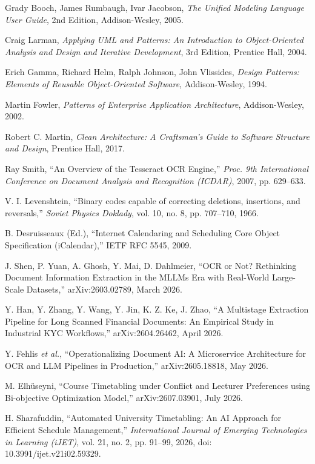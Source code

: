 
\begin{enumerate}[label={[\arabic*]}, leftmargin=*, itemsep=6pt]
  \item Grady Booch, James Rumbaugh, Ivar Jacobson, \textit{The Unified Modeling Language User Guide}, 2nd Edition, Addison-Wesley, 2005.
  \item Craig Larman, \textit{Applying UML and Patterns: An Introduction to Object-Oriented Analysis and Design and Iterative Development}, 3rd Edition, Prentice Hall, 2004.
  \item Erich Gamma, Richard Helm, Ralph Johnson, John Vlissides, \textit{Design Patterns: Elements of Reusable Object-Oriented Software}, Addison-Wesley, 1994.
  \item Martin Fowler, \textit{Patterns of Enterprise Application Architecture}, Addison-Wesley, 2002.
  \item Robert C. Martin, \textit{Clean Architecture: A Craftsman's Guide to Software Structure and Design}, Prentice Hall, 2017.
  \item Ray Smith, ``An Overview of the Tesseract OCR Engine,'' \textit{Proc. 9th International Conference on Document Analysis and Recognition (ICDAR)}, 2007, pp. 629--633.
  \item V. I. Levenshtein, ``Binary codes capable of correcting deletions, insertions, and reversals,'' \textit{Soviet Physics Doklady}, vol. 10, no. 8, pp. 707--710, 1966.
  \item B. Desruisseaux (Ed.), ``Internet Calendaring and Scheduling Core Object Specification (iCalendar),'' IETF RFC 5545, 2009.
  \item J. Shen, P. Yuan, A. Ghosh, Y. Mai, D. Dahlmeier, ``OCR or Not? Rethinking Document Information Extraction in the MLLMs Era with Real-World Large-Scale Datasets,'' arXiv:2603.02789, March 2026.
  \item Y. Han, Y. Zhang, Y. Wang, Y. Jin, K. Z. Ke, J. Zhao, ``A Multistage Extraction Pipeline for Long Scanned Financial Documents: An Empirical Study in Industrial KYC Workflows,'' arXiv:2604.26462, April 2026.
  \item Y. Fehlis \textit{et al.}, ``Operationalizing Document AI: A Microservice Architecture for OCR and LLM Pipelines in Production,'' arXiv:2605.18818, May 2026.
  \item M. Elhüseyni, ``Course Timetabling under Conflict and Lecturer Preferences using Bi-objective Optimization Model,'' arXiv:2607.03901, July 2026.
  \item H. Sharafuddin, ``Automated University Timetabling: An AI Approach for Efficient Schedule Management,'' \textit{International Journal of Emerging Technologies in Learning (iJET)}, vol. 21, no. 2, pp. 91--99, 2026, doi: 10.3991/ijet.v21i02.59329.
\end{enumerate}

